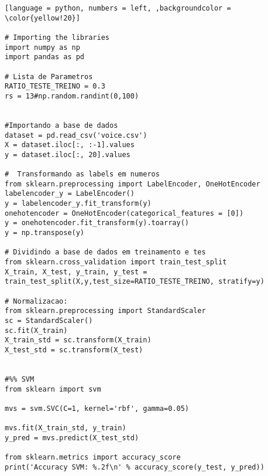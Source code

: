 \begin{lstlisting}[language = python, numbers = left, ,backgroundcolor = \color{yellow!20}]

# Importing the libraries
import numpy as np
import pandas as pd

# Lista de Parametros
RATIO_TESTE_TREINO = 0.3
rs = 13#np.random.randint(0,100)


#Importando a base de dados
dataset = pd.read_csv('voice.csv')
X = dataset.iloc[:, :-1].values
y = dataset.iloc[:, 20].values

#  Transformando as labels em numeros
from sklearn.preprocessing import LabelEncoder, OneHotEncoder
labelencoder_y = LabelEncoder()
y = labelencoder_y.fit_transform(y)
onehotencoder = OneHotEncoder(categorical_features = [0])
y = onehotencoder.fit_transform(y).toarray()
y = np.transpose(y)

# Dividindo a base de dados em treinamento e tes
from sklearn.cross_validation import train_test_split
X_train, X_test, y_train, y_test = train_test_split(X,y,test_size=RATIO_TESTE_TREINO, stratify=y)

# Normalizacao:
from sklearn.preprocessing import StandardScaler
sc = StandardScaler()
sc.fit(X_train)
X_train_std = sc.transform(X_train)
X_test_std = sc.transform(X_test)


#%% SVM
from sklearn import svm

mvs = svm.SVC(C=1, kernel='rbf', gamma=0.05)

mvs.fit(X_train_std, y_train)
y_pred = mvs.predict(X_test_std)

from sklearn.metrics import accuracy_score
print('Accuracy SVM: %.2f\n' % accuracy_score(y_test, y_pred))



\end{lstlisting}